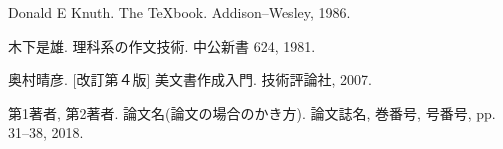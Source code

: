 
\begin{thebibliography}{1}
Donald E Knuth. The \TeX book. Addison--Wesley, 1986.

木下是雄. 理科系の作文技術. 中公新書 624, 1981.


奥村晴彦. [改訂第４版] \LaTeXe 美文書作成入門. 技術評論社, 2007.

第1著者, 第2著者.
\newblock 論文名(論文の場合のかき方).
\newblock 論文誌名, 巻番号, 号番号, pp. 31--38, 2018.


\end{thebibliography}


%

